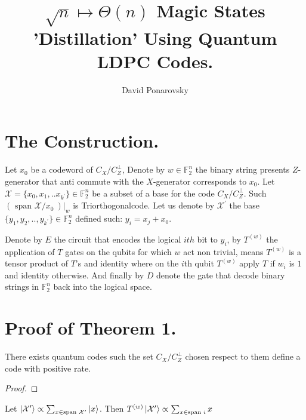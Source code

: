 \documentclass[manuscript,screen,review]{acmart}
\begin{document}

\title{ $\sqrt{n} \mapsto \Theta(n)$  Magic States 'Distillation' Using
Quantum LDPC Codes. }
\author{David Ponarovsky}
\maketitle

\newcommand*{\Mbas}{\mathcal{X}^\prime}
\newcommand*{\QQ}{C_{X}/C_{Z}^\perp }
\newcommand*{\trig}{Triorthogonal}

\section{The Construction.}

Let $x_{0}$ be a codeword of $\QQ$,  Denote by $w \in \mathbb{F}_{2}^{n}$
the binary string presents $Z$-generator that anti commute with the
$X$-generator corresponds to $x_{0}$. Let $\mathcal{X} = \{x_{0}, x_{1}, .. x_{k^\prime}\} \in \mathbb{F}_{2}^{n}$ be a
subset of a base for the code $\QQ$. Such $\left(\text{ span } \mathcal{X}/x_0 \ \right)|_{w}$ is \trig code.  
Let us denote by $\Mbas$ the base $\{ y_{1}, y_{2}, .., y_{k^\prime} \} \in
\mathbb{F}_{2}^{n}$ defined such: $ y_{i} = x_{j} + x_{0}$. 

Denote by $E$ the circuit that encodes the logical $ith$ bit to $y_{i}$, by $T^{(w)}$ the application of
$T$ gates on the qubits for which $w$ act non trivial, means $T^{(w)}$ is a
tensor product of $T$'s and identity where on the $i$th qubit $T^{(w)}$ apply
$T$ if $w_{i}$ is $1$ and identity otherwise. And finally by $D$ denote the gate that decode binary strings in $\mathbb{F}_{2}^{n}$ back into the logical space.


\section{Proof of Theorem 1.}

\begin{claim}
  There exists quantum codes such the set $\QQ$ chosen respect to them define a code with positive rate.   
\end{claim}
\begin{proof}
  
\end{proof}

\begin{claim}
  Let $\ket{\Mbas} \propto \sum_{x \in \text{span } \Mbas }{\ket{x}}$. Then $T^{(w)}\ket{\Mbas} \propto \sum_{x \in \text{span }i}{  x  }$
\end{claim}





%

\printbibliography
\end{document}
